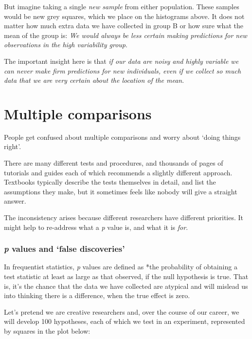 \documentclass[]{article}
\theoremstyle{definition}
\theoremstyle{definition}
\theoremstyle{definition}
\theoremstyle{remark}
\begin{document}
But imagine taking a single \emph{new sample} from either population.
These samples would be new grey squares, which we place on the
histograms above. It does not matter how much extra data we have
collected in group B or how sure what the mean of the group is: \emph{We
would always be less certain making predictions for new observations in
the high variability group}.

The important insight here is that \emph{if our data are noisy and
highly variable we can never make firm predictions for new individuals,
even if we collect so much data that we are very certain about the
location of the mean}.

\hypertarget{multiple-comparisons}{\section{Multiple
comparisons}\label{multiple-comparisons}}

People get confused about multiple comparisons and worry about `doing
things right'.

There are many different tests and procedures, and thousands of pages of
tutorials and guides each of which recommends a slightly different
approach. Textbooks typically describe the tests themselves in detail,
and list the assumptions they make, but it sometimes feels like nobody
will give a straight answer.

The inconsistency arises because different researchers have different
priorities. It might help to re-address what a \emph{p} value is, and
what it is \emph{for}.

\subsubsection*{\texorpdfstring{\emph{p} values and `false
discoveries'}{p values and false discoveries}}\label{p-values-and-false-discoveries}

In frequentist statistics, \emph{p} values are defined as *the
probability of obtaining a test statistic at least as large as that
observed, if the null hypothesis is true. That is, it's the chance that
the data we have collected are atypical and will mislead us into
thinking there is a difference, when the true effect is zero.

Let's pretend we are creative researchers and, over the course of our
career, we will develop 100 hypotheses, each of which we test in an
experiment, represented by squares in the plot below:
\end{document}
